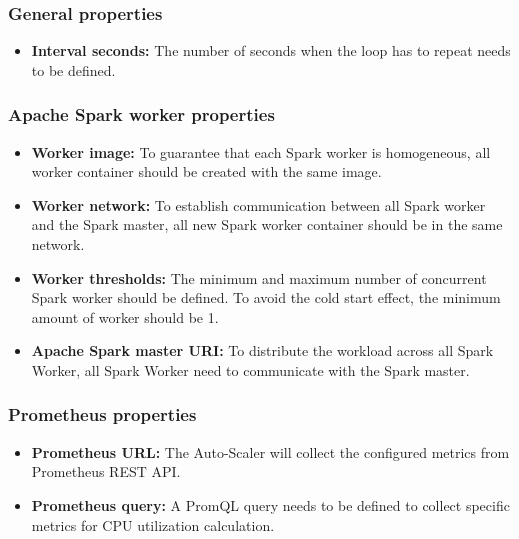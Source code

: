 \subsubsection{General properties}

\begin{itemize}
\item \textbf{Interval seconds:} The number of seconds when the loop has to repeat needs to be defined.
\end{itemize}

\subsubsection{Apache Spark worker properties}

\begin{itemize}
\item \textbf{Worker image:} To guarantee that each Spark worker is homogeneous, all worker container should be created with the same image.

\item \textbf{Worker network:} To establish communication between all Spark worker and the Spark master, all new Spark worker container should be in the same network.

\item \textbf{Worker thresholds:} The minimum and maximum number of concurrent Spark worker should be defined. To avoid the cold start effect, the minimum amount of worker should be 1. 

\item \textbf{Apache Spark master URI:} To distribute the workload across all Spark Worker, all Spark Worker need to communicate with the Spark master.
\end{itemize}

\subsubsection{Prometheus properties}

\begin{itemize}
\item \textbf{Prometheus URL:} The Auto-Scaler will collect the configured metrics from Prometheus REST API.

\item \textbf{Prometheus query:} A PromQL query needs to be defined to collect specific metrics for CPU utilization calculation. 
\end{itemize}


